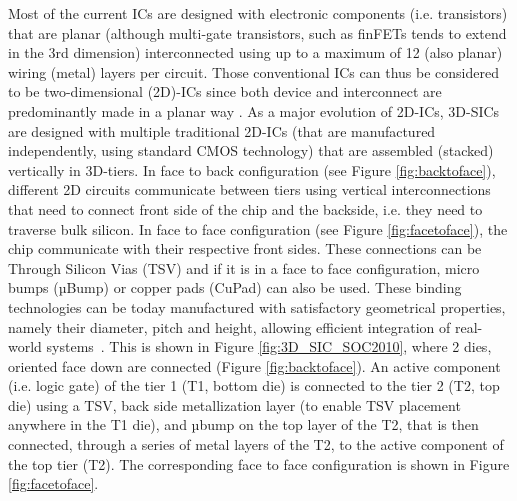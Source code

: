 Most of the current ICs are designed with electronic components (i.e. transistors) that are planar (although multi-gate transistors, such as finFETs tends to extend in the 3rd dimension) interconnected using up to a maximum of 12 (also planar) wiring (metal) layers per circuit. Those conventional ICs can thus be considered to be two-dimensional (2D)-ICs since both device and interconnect are predominantly made in a planar way \cite{1393404,fujitsu08}. As a major evolution of 2D-ICs, 3D-SICs are designed with multiple traditional 2D-ICs (that are manufactured independently, using standard CMOS technology) that are assembled (stacked) vertically in 3D-tiers. In face to back configuration (see Figure \ref{fig:backtoface}), different 2D circuits communicate between tiers using vertical interconnections that need to connect front side of the chip and the backside, i.e. they need to traverse bulk silicon. In face to face configuration (see Figure \ref{fig:facetoface}), the chip communicate with their respective front sides. These connections can be Through Silicon Vias (TSV) and if it is in a face to face configuration, micro bumps (µBump) or copper pads (CuPad) can also be used. These binding technologies can be today manufactured with satisfactory geometrical properties, namely their diameter, pitch and height, allowing efficient integration of real-world systems~\cite{1705326,5746413}. This is shown in Figure \ref{fig:3D_SIC_SOC2010}, where 2 dies, oriented face down are connected (Figure \ref{fig:backtoface}). An active component (i.e. logic gate) of the tier 1 (T1, bottom die) is connected to the tier 2 (T2, top die) using a TSV, back side metallization layer (to enable TSV placement anywhere in the T1 die), and µbump on the top layer of the T2, that is then connected, through a series of metal layers of the T2, to the active component of the top tier (T2). The corresponding face to face configuration is shown in Figure \ref{fig:facetoface}.

